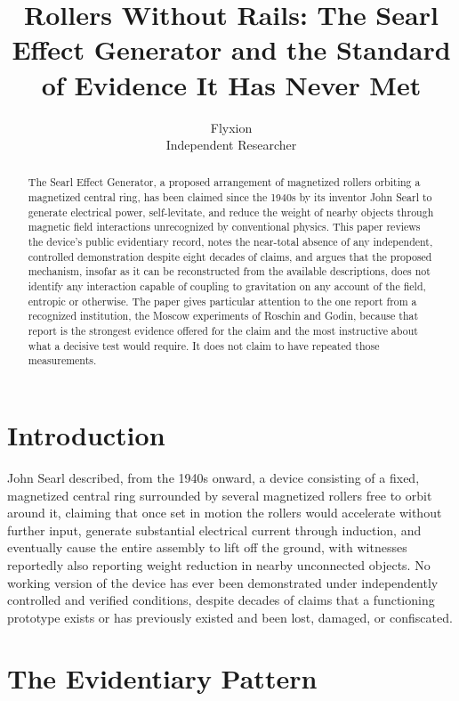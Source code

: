 \documentclass[11pt]{article}
\title{Rollers Without Rails: The Searl Effect Generator and the Standard of Evidence It Has Never Met}
\author{Flyxion \\ \small Independent Researcher}
\date{}
\begin{document}
\maketitle

\begin{abstract}
The Searl Effect Generator, a proposed arrangement of magnetized rollers orbiting a magnetized central ring, has been claimed since the 1940s by its inventor John Searl to generate electrical power, self-levitate, and reduce the weight of nearby objects through magnetic field interactions unrecognized by conventional physics. This paper reviews the device's public evidentiary record, notes the near-total absence of any independent, controlled demonstration despite eight decades of claims, and argues that the proposed mechanism, insofar as it can be reconstructed from the available descriptions, does not identify any interaction capable of coupling to gravitation on any account of the field, entropic or otherwise. The paper gives particular attention to the one report from a recognized institution, the Moscow experiments of Roschin and Godin, because that report is the strongest evidence offered for the claim and the most instructive about what a decisive test would require. It does not claim to have repeated those measurements.
\end{abstract}

\section{Introduction}

John Searl described, from the 1940s onward, a device consisting of a fixed, magnetized central ring surrounded by several magnetized rollers free to orbit around it, claiming that once set in motion the rollers would accelerate without further input, generate substantial electrical current through induction, and eventually cause the entire assembly to lift off the ground, with witnesses reportedly also reporting weight reduction in nearby unconnected objects. No working version of the device has ever been demonstrated under independently controlled and verified conditions, despite decades of claims that a functioning prototype exists or has previously existed and been lost, damaged, or confiscated.

\section{The Evidentiary Pattern}
\end{document}
